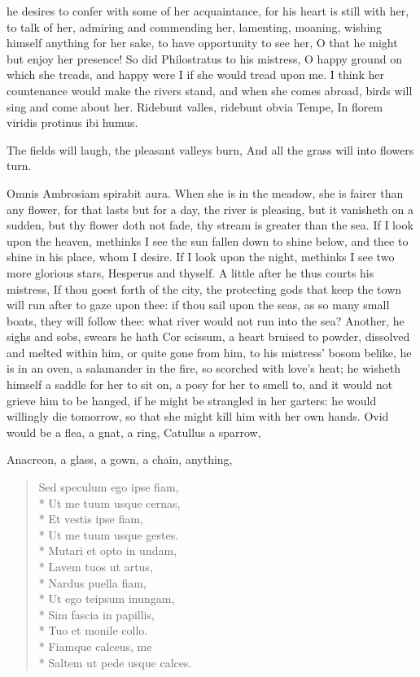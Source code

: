{he desires to confer with some of her acquaintance, for his heart
is still with her, to talk of her, admiring and commending her,
lamenting, moaning, wishing himself anything for her sake, to have
opportunity to see her, O that he might but enjoy her presence! So did
Philostratus to his mistress, O happy ground on which she treads,
and happy were I if she would tread upon me. I think her countenance
would make the rivers stand, and when she comes abroad, birds will sing
and come about her.
Ridebunt valles, ridebunt obvia Tempe,
In florem viridis protinus ibi humus.

The fields will laugh, the pleasant valleys burn,
And all the grass will into flowers turn.

Omnis Ambrosiam spirabit aura. When she is in the meadow, she is
fairer than any flower, for that lasts but for a day, the river is
pleasing, but it vanisheth on a sudden, but thy flower doth not fade,
thy stream is greater than the sea. If I look upon the heaven, methinks
I see the sun fallen down to shine below, and thee to shine in his
place, whom I desire. If I look upon the night, methinks I see two more
glorious stars, Hesperus and thyself. A little after he thus courts his
mistress,  If thou goest forth of the city, the protecting gods
that keep the town will run after to gaze upon thee: if thou sail upon
the seas, as so many small boats, they will follow thee: what river
would not run into the sea? Another, he sighs and sobs, swears he hath
Cor scissum, a heart bruised to powder, dissolved and melted within
him, or quite gone from him, to his mistress' bosom belike, he is in an
oven, a salamander in the fire, so scorched with love's heat; he
wisheth himself a saddle for her to sit on, a posy for her to smell to,
and it would not grieve him to be hanged, if he might be strangled in
her garters: he would willingly die tomorrow, so that she might kill
him with her own hands. Ovid would be a flea, a gnat, a ring,
Catullus a sparrow,

Anacreon, a glass, a gown, a chain, anything,
\begin{latin}
\begin{verse}
Sed speculum ego ipse fiam,\\*
Ut me tuum usque cernas,\\*
Et vestis ipse fiam,\\*
Ut me tuum usque gestes.\\*
Mutari et opto in undam,\\*
Lavem tuos ut artus,\\*
Nardus puella fiam,\\*
Ut ego teipsum inungam,\\*
Sim fascia in papillis,\\*
Tuo et monile collo.\\*
Fiamque calceus, me\\*
Saltem ut pede usque calces.
\end{verse}
\end{latin}

}
